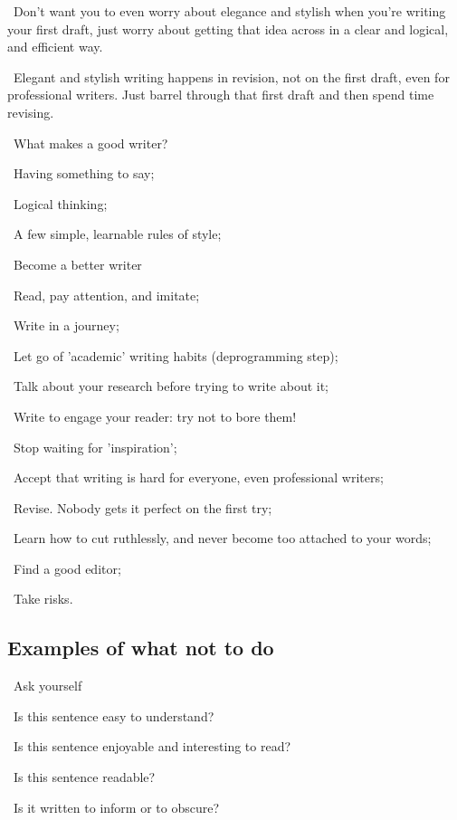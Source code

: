 \documentclass[a4paper,12pt]{article}
\begin{document}
\par\textbullet\ Don't want you to even worry about elegance and stylish when you're writing your first draft, just worry about getting that idea across in a clear and logical, and efficient way.

\par\textbullet\ Elegant and stylish writing happens in revision, not on the first draft, even for professional writers. Just barrel through that first draft and then spend time revising.

\par\textbullet\ What makes a good writer?
\par\quad\textopenbullet\ Having something to say;
\par\quad\textopenbullet\ Logical thinking;
\par\quad\textopenbullet\ A few simple, learnable rules of style;

\par\textbullet\ Become a better writer
\par\quad\textopenbullet\ Read, pay attention, and imitate;
\par\quad\textopenbullet\ Write in a journey;
\par\quad\textopenbullet\ Let go of 'academic' writing habits (deprogramming step);
\par\quad\textopenbullet\ Talk about your research before trying to write about it;
\par\quad\textopenbullet\ Write to engage your reader: try not to bore them!
\par\quad\textopenbullet\ Stop waiting for 'inspiration';
\par\quad\textopenbullet\ Accept that writing is hard for everyone, even professional writers;
\par\quad\textopenbullet\ Revise. Nobody gets it perfect on the first try;
\par\quad\textopenbullet\ Learn how to cut ruthlessly, and never become too attached to your words;
\par\quad\textopenbullet\ Find a good editor;
\par\quad\textopenbullet\ Take risks.

\subsection{Examples of what not to do}

\par\textbullet\ Ask yourself
\par\quad\textopenbullet\ Is this sentence easy to understand?
\par\quad\textopenbullet\ Is this sentence enjoyable and interesting to read?
\par\quad\textopenbullet\ Is this sentence readable?
\par\quad\textopenbullet\ Is it written to inform or to obscure?
\end{document}
